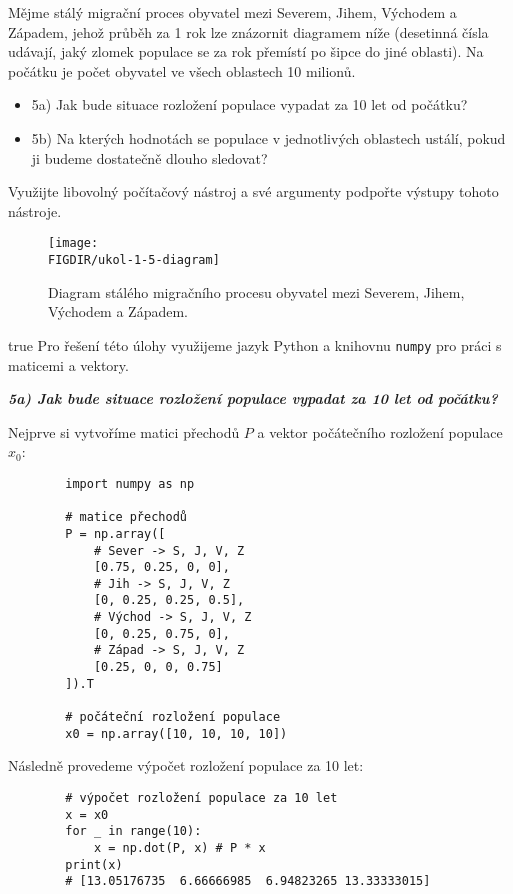 \documentclass[10pt, a4paper]{ReportSheet}
\begin{document}
    \begin{uloha}{5}{3}{
        Mějme stálý migrační proces obyvatel mezi Severem, Jihem, Východem a Západem, jehož průběh za 1 rok lze znázornit diagramem níže (desetinná čísla udávají, jaký zlomek populace se za rok přemístí po šipce do jiné oblasti). Na počátku je počet obyvatel ve všech oblastech 10 milionů.

        \begin{itemize}
            \item 5a) Jak bude situace rozložení populace vypadat za 10 let od počátku?
            \item 5b) Na kterých hodnotách se populace v jednotlivých oblastech ustálí, pokud ji budeme dostatečně dlouho sledovat?
        \end{itemize}

        Využijte libovolný počítačový nástroj a své argumenty podpořte výstupy tohoto nástroje.

        \begin{figure}[H]
            \centering
            \texttt{[image: \\FIGDIR/ukol-1-5-diagram]}
            \caption{Diagram stálého migračního procesu obyvatel mezi Severem, Jihem, Východem a Západem.}
            \label{fig:population-migration}
        \end{figure}
        \source{}
    }{true}
        Pro řešení této úlohy využijeme jazyk Python a knihovnu \texttt{numpy} pro práci s maticemi a vektory.

        \textbf{\textit{5a) Jak bude situace rozložení populace vypadat za 10 let od počátku?}}

        Nejprve si vytvoříme matici přechodů $P$ a vektor počátečního rozložení populace $x_0$:
        \begin{verbatim}
        import numpy as np

        # matice přechodů
        P = np.array([
            # Sever -> S, J, V, Z
            [0.75, 0.25, 0, 0],
            # Jih -> S, J, V, Z
            [0, 0.25, 0.25, 0.5],
            # Východ -> S, J, V, Z
            [0, 0.25, 0.75, 0],
            # Západ -> S, J, V, Z
            [0.25, 0, 0, 0.75]
        ]).T

        # počáteční rozložení populace
        x0 = np.array([10, 10, 10, 10])
        \end{verbatim}

        Následně provedeme výpočet rozložení populace za 10 let:
        \begin{verbatim}
        # výpočet rozložení populace za 10 let
        x = x0
        for _ in range(10):
            x = np.dot(P, x) # P * x
        print(x)
        # [13.05176735  6.66666985  6.94823265 13.33333015]
        \end{verbatim}


\end{uloha}
\end{document}
